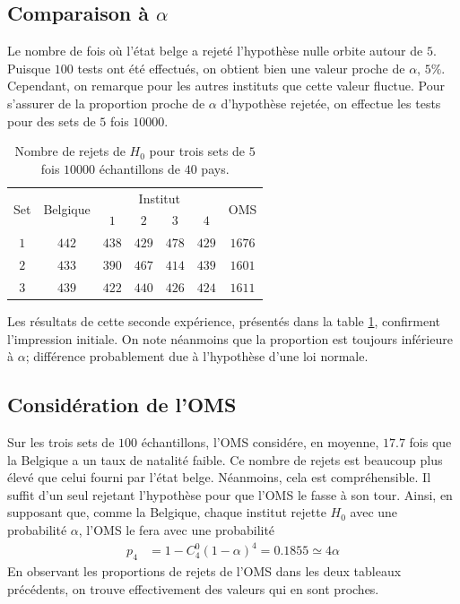 \documentclass[a4paper, 12pt]{article}
\begin{document}
	\subsection{Comparaison à $\alpha$}
	Le nombre de fois où l'état belge a rejeté l'hypothèse nulle orbite autour de $5$. Puisque $100$ tests ont été effectués, on obtient bien une valeur proche de $\alpha$, \cad $5 \%$. Cependant, on remarque pour les autres instituts que cette valeur fluctue. Pour s'assurer de la proportion proche de $\alpha$ d'hypothèse rejetée, on effectue les tests pour des sets de $5$ fois $\num{10000}$. \par
    \begin{table}[h!]
		\centering
		\begin{tabular}{|c|c|c|c|c|c|c|}
			\hline
			\multirow{2}{*}{Set} & \multirow{2}{*}{Belgique} & \multicolumn{4}{c|}{Institut} & \multirow{2}{*}{OMS} \\ \cline{3-6}
			                     &                           &  $1$  &  $2$  &  $3$  &  $4$  &  \\ \hline\hline
			        $1$          &           $442$           & $438$ & $429$ & $478$ & $429$ &        $1676$        \\ \hline
			        $2$          &           $433$           & $390$ & $467$ & $414$ & $439$ &        $1601$        \\ \hline
			        $3$          &           $439$           & $422$ & $440$ & $426$ & $424$ &        $1611$        \\ \hline
		\end{tabular}
		\caption{Nombre de rejets de $H_{0}$ pour trois sets de $5$ fois $\num{10000}$ échantillons de $40$ pays.}
		\label{table:Q4bis}
	\end{table}
	Les résultats de cette seconde expérience, présentés dans la table \ref{table:Q4bis}, confirment l'impression initiale. On note néanmoins que la proportion est toujours inférieure à $\alpha$; différence probablement due à l'hypothèse d'une loi normale.
	\subsection{Considération de l'OMS}
	Sur les trois sets de $100$ échantillons, l'OMS considére, en moyenne, $\num{17.7}$ fois que la Belgique a un taux de natalité faible. Ce nombre de rejets est beaucoup plus élevé que celui fourni par l'état belge. Néanmoins, cela est compréhensible. Il suffit d'un seul rejetant l'hypothèse pour que l'OMS le fasse à son tour. Ainsi, en supposant que, comme la Belgique, chaque institut rejette $H_0$ avec une probabilité $\alpha$, l'OMS le fera avec une probabilité
	\begin{align*}
	    p_4 & = 1 - C^0_4 (1 - \alpha)^{4} = \num{0.1855} \simeq 4 \alpha
	\end{align*}
	En observant les proportions de rejets de l'OMS dans les deux tableaux précédents, on trouve effectivement des valeurs qui en sont proches.
\end{document}

